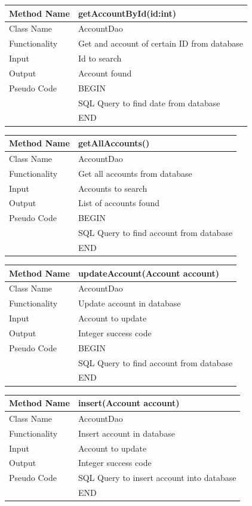 \documentclass[12pt]{article}
\begin{document}
\begin{tabular}{ |p{3cm}||p{\colWidth}|  }
	\hline
	Method Name &  getAccountById(id:int)\\
	\hline
	Class Name & AccountDao\\
	\hline
	Functionality & Get and account of certain ID from database\\
	\hline
	Input & Id to search\\
	\hline
	Output &  Account found\\
	\hline
	Pseudo Code&BEGIN\\ & SQL Query to find date from database\\&END\\
	\hline
\end{tabular}    

\begin{tabular}{ |p{3cm}||p{\colWidth}|  }
	\hline
	Method Name &  getAllAccounts()\\
	\hline
	Class Name & AccountDao\\
	\hline
	Functionality & Get all accounts from database\\
	\hline
	Input & Accounts to search\\
	\hline
	Output & List of accounts found\\
	\hline
	Pseudo Code &BEGIN\\& SQL Query to find account from database\\&END\\
	\hline
\end{tabular}    

\begin{tabular}{ |p{3cm}||p{\colWidth}|  }
	\hline
	Method Name &  updateAccount(Account account)\\
	\hline
	Class Name & AccountDao\\
	\hline
	Functionality & Update account in database\\
	\hline
	Input & Account to update\\
	\hline
	Output & Integer success code\\
	\hline
	Pseudo Code&BEGIN\\ & SQL Query to find account from database\\&END\\
	\hline
\end{tabular}


\begin{tabular}{ |p{3cm}||p{\colWidth}|  }
	\hline
	Method Name &  insert(Account account)\\
	\hline
	Class Name & AccountDao\\
	\hline
	Functionality & Insert account in database\\
	\hline
	Input & Account to update\\
	\hline
	Output & Integer success code\\
	\hline
	Pseudo Code & SQL Query to insert account into database\\&END\\
	\hline
\end{tabular}
\end{document}
